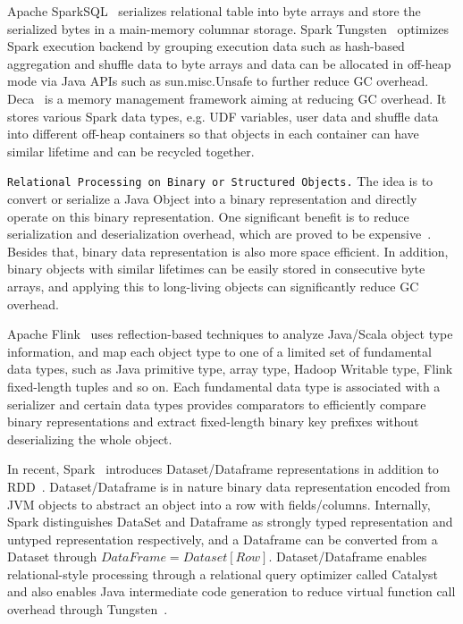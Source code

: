 Apache SparkSQL~\cite{armbrust2015spark} serializes 
relational table into byte arrays and store the serialized bytes
in a main-memory columnar storage. Spark Tungsten~\cite{tungsten}
optimizes Spark execution backend by grouping execution
data such as hash-based aggregation and shuffle data
to byte arrays and data can be allocated in off-heap mode via
Java APIs such as sun.misc.Unsafe to
further reduce GC overhead. Deca~\cite{lu2016lifetime} is a memory management framework aiming at
reducing GC overhead. It stores
various Spark data types, e.g. UDF variables, user data and
shuffle data into different
off-heap containers so that objects in each container can have similar
lifetime and can be recycled together.

\vspace{5pt}
\texttt {Relational Processing on Binary or Structured Objects.} The idea is to convert or
serialize a Java Object into a binary representation and directly
operate on this binary representation. One significant benefit is to reduce serialization and
deserialization overhead, which are proved to be expensive~\cite{ousterhout2015making}. 
Besides that, binary data representation is also more space efficient. In addition, binary objects
with similar lifetimes can be easily stored in consecutive byte
arrays, and applying this to long-living objects can significantly reduce GC overhead.

Apache Flink~\cite{alexandrov2014stratosphere} uses reflection-based
techniques to analyze Java/Scala object type information, and
map each object type to one of a limited set of
fundamental data types, such as Java primitive type, array type,
Hadoop Writable type, Flink fixed-length tuples and so on. Each
fundamental data type is associated with a serializer and certain data
types provides comparators to efficiently compare binary
representations and extract fixed-length binary key prefixes without
deserializing the whole object.

In recent, Spark~\cite{tungsten} introduces Dataset/Dataframe representations
in addition to RDD~\cite{zaharia2012resilient}. Dataset/Dataframe is
in nature binary data representation encoded from JVM objects to
abstract an object  into a row with fields/columns. Internally,
Spark distinguishes DataSet and Dataframe as strongly typed representation and
untyped representation respectively, and a Dataframe can be
converted from a Dataset through $ DataFrame =
Dataset[Row] $. Dataset/Dataframe enables relational-style processing
through a relational query optimizer called Catalyst and
also enables Java intermediate code generation to reduce virtual
function call overhead through Tungsten~\cite{tungsten}. 

